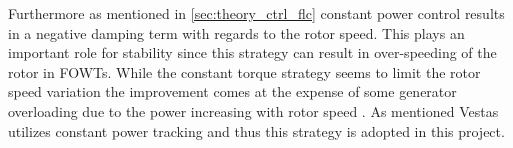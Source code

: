 \smallskip
Furthermore as mentioned in \cref{sec:theory_ctrl_flc} constant power control results in a negative damping term with regards to the rotor speed. This plays an important role for stability since this strategy can result in over-speeding of the rotor in FOWTs. While the constant torque strategy seems to limit the rotor speed variation the improvement comes at the expense of some generator overloading due to the power increasing with rotor speed \cite{Jonkman2010}. As mentioned Vestas utilizes constant power tracking and thus this strategy is adopted in this project.